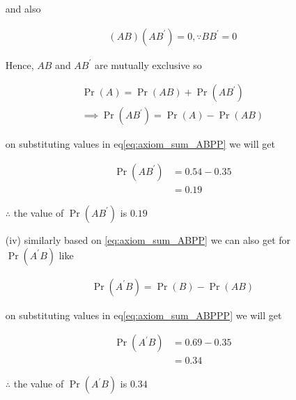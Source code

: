 \documentclass[journal,12pt,twocolumn]{IEEEtran}
\providecommand{\brak}[1]{\ensuremath{\left(#1\right)}}
\providecommand{\pr}[1]{\ensuremath{\Pr\left(#1\right)}}
\begin{document}
\begin{enumerate}
            and also
    
            \begin{align}
                  \brak{ AB}\brak{  AB^{\prime}} = 0, \because BB^{\prime} = 0
                  \label{eq:axiom_sum_ABP}
            \end{align}
                  
            Hence, $AB$ and $AB^{\prime}$ are mutually exclusive so 
    
            \begin{align}
                     \pr{A} = \pr{AB} + \pr{AB^{\prime}} \\
                  \implies 
                     \pr{A B^{\prime}} =  \pr{A} - \pr{AB}
                     \label{eq:axiom_sum_ABPP}
            \end{align}
    
            on substituting values in eq\eqref{eq:axiom_sum_ABPP} we will get
            
            \begin{align}
                     \pr{A B^{\prime}} &= 0.54 - 0.35 \\
                                       &= 0.19
            \end{align}
            
            $\therefore$ the value of $\pr{A B^{\prime}}$ is $0.19$
            
            
            
    \item[(iv)] similarly based on \eqref{eq:axiom_sum_ABPP} we can also get for $\pr{A^{\prime} B}$ like 
    
            \begin{align}
                   \pr{A^{\prime} B} =  \pr{B} - \pr{AB}
                   \label{eq:axiom_sum_ABPPP}
            \end{align}
            
            on substituting values in eq\eqref{eq:axiom_sum_ABPPP} we will get

            \begin{align}
                     \pr{A^{\prime} B} &= 0.69 - 0.35 \\
                                       &= 0.34
            \end{align}
            
            $\therefore$ the value of $\pr{A^{\prime} B}$ is $0.34$
            
            
         
    
           
    


\end{enumerate}
\end{document}
